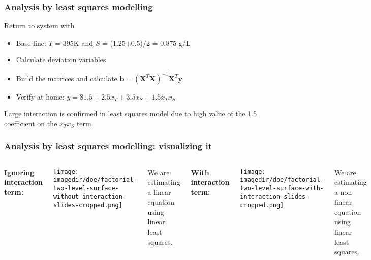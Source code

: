 \begin{frame}\frametitle{Analysis by least squares modelling}

	Return to system with {}
	\begin{itemize}
		\item	Base line: $T$ = 395K and $S$ = (1.25+0.5)/2 = 0.875 g/L
		\item	Calculate deviation variables
		\item	Build the matrices and calculate $\mathbf{b} = (\mathbf{X}^T\mathbf{X})^{-1}\mathbf{X}^T\mathbf{y}$
		\item	Verify at home: $y = 81.5 + 2.5 x_T + 3.5 x_S + 1.5 x_T x_S$
	\end{itemize}
	
	\vspace{12pt}
	Large interaction is confirmed in least squares model due to high value of the 1.5 coefficient on the $x_T x_S$ term
\end{frame}

\begin{frame}\frametitle{Analysis by least squares modelling: visualizing it}
	{\color{myOrange}{High interaction system:}}
	\vspace{12pt}
	\begin{columns}
		\column{5cm} 
			\textbf{Ignoring interaction term:}
			\begin{center}
				\texttt{[image: \\imagedir/doe/factorial-two-level-surface-without-interaction-slides-cropped.png]}
			\end{center}
			We are estimating a linear equation using linear least squares. 
		
		\column{5cm} 
			\textbf{With interaction term:}
			\begin{center}
				\texttt{[image: \\imagedir/doe/factorial-two-level-surface-with-interaction-slides-cropped.png]}
			\end{center}
			We are estimating a non-linear equation using linear least squares.
	\end{columns}
\end{frame}

